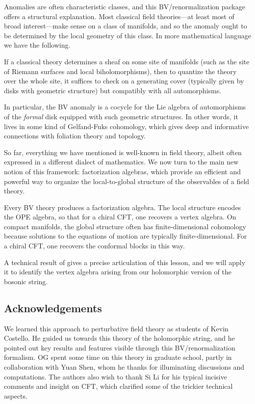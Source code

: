Anomalies are often characteristic classes, and this BV/renormalization package offers a structural explanation.
Most classical field theories---at least most of broad interest---make sense on a class of manifolds,
and so the anomaly ought to be determined by the local geometry of this class.
In more mathematical language we have the following.

\begin{lesson}
If a classical theory determines a sheaf on some site of manifolds (such as the site of Riemann surfaces and local biholomorphisms), 
then to quantize the theory over the whole site, 
it suffices to check on a generating cover (typically given by disks with geometric structure) but compatibly with all automorphisms.
\end{lesson}

In particular, the BV anomaly is a cocycle for the Lie algebra of automorphisms of the {\em formal} disk equipped with such geometric structures.
In other words, it lives in some kind of Gelfand-Fuks cohomology, which gives deep and informative connections with foliation theory and topology.

So far, everything we have mentioned is well-known in field theory, 
albeit often expressed in a different dialect of mathematics.
We now turn to the main new notion of this framework:
factorization algebras, which provide an efficient and powerful way to organize the local-to-global structure of the observables of a field theory.

\begin{lesson}[\cite{CG1,CG2}]
Every BV theory produces a factorization algebra. 
The local structure encodes the OPE algebra, so that for a chiral CFT, one recovers a vertex algebra. 
On compact manifolds, the global structure often has finite-dimensional cohomology because solutions to the equations of motion are typically finite-dimensional.
For a chiral CFT, one recovers the conformal blocks in this way.
\end{lesson}

A technical result of \cite{CG1} gives a precise articulation of this lesson,
and we will apply it to identify the vertex algebra arising from our holomorphic version of the bosonic string.

\subsection{Acknowledgements}

We learned this approach to perturbative field theory as students of Kevin Costello.
He guided us towards this theory of the holomorphic string,  
and he pointed out key results and features visible through this BV/renormalization formalism. 
OG spent some time on this theory in graduate school,
partly in collaboration with Yuan Shen,
whom he thanks for illuminating discussions and computations.
The authors also wish to thank Si Li for his typical incisive comments and insight on CFT,
which clarified some of the trickier technical aspects.

